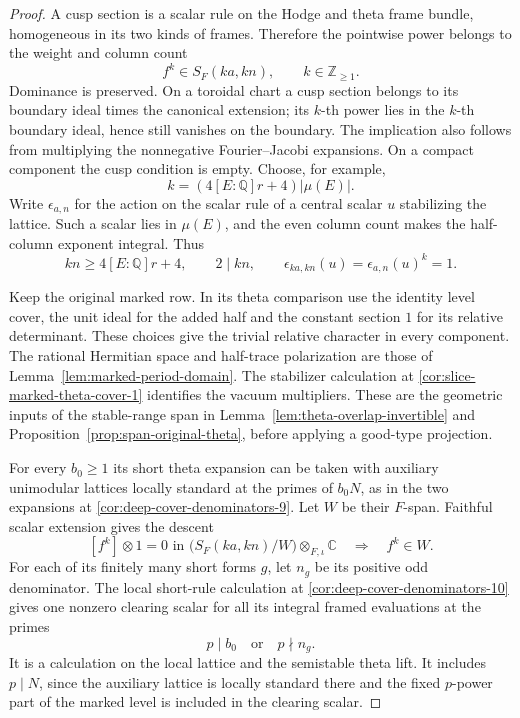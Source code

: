 \begin{proof}
A cusp section is a scalar rule on the Hodge and theta frame
bundle, homogeneous in its two kinds of frames. Therefore the
pointwise power belongs to the weight and column count
\[
       f^k\in S_F(ka,kn),\qquad k\in\mathbb Z_{\ge1}.
\]
Dominance is preserved. On a toroidal chart a cusp section belongs
to its boundary ideal times the canonical extension; its \(k\)-th
power lies in the \(k\)-th boundary ideal, hence still vanishes
on the boundary. The implication also follows from multiplying
the nonnegative Fourier--Jacobi expansions. On a compact
component the cusp condition is empty. Choose, for example,
\[
        k=(4[E:\mathbb Q]r+4)|\mu(E)|.
\]
Write \(\epsilon_{a,n}\) for the action on the scalar rule
of a central scalar \(u\) stabilizing the lattice. Such a
scalar lies in \(\mu(E)\), and the even column count makes the
half-column exponent integral. Thus
\[
 kn\ge 4[E:\mathbb Q]r+4,\qquad 2\mid kn,\qquad
 \epsilon_{ka,kn}(u)=\epsilon_{a,n}(u)^k=1 .
\]

Keep the original marked row. In its theta comparison use the
identity level cover, the unit ideal for the added half and the
constant section \(1\) for its relative determinant. These choices
give the trivial relative character in every component. The
rational Hermitian space and half-trace polarization are those
of Lemma~\ref{lem:marked-period-domain}. The stabilizer calculation
at \ref{cor:slice-marked-theta-cover-1} identifies the vacuum
multipliers. These are the geometric inputs of the stable-range
span in Lemma~\ref{lem:theta-overlap-invertible} and
Proposition~\ref{prop:span-original-theta}, before applying a
good-type projection.

For every \(b_0\ge1\) its short theta expansion can be taken
with auxiliary unimodular lattices locally standard at
the primes of \(b_0N\), as in the two expansions
at \ref{cor:deep-cover-denominators-9}. Let \(W\) be their
\(F\)-span. Faithful scalar extension gives the descent
\[
  [f^k]\otimes1=0\text{ in }
  \bigl(S_F(ka,kn)/W\bigr)\otimes_{F,\iota}\mathbb C
                \quad\Longrightarrow\quad f^k\in W .
\]
For each of its finitely many short forms \(g\), let \(n_g\)
be its positive odd denominator. The local short-rule calculation
at \ref{cor:deep-cover-denominators-10} gives one nonzero clearing
scalar for all its integral framed evaluations at the primes
\[
                  p\mid b_0\quad\text{or}\quad p\nmid n_g .
\]
It is a calculation on the local lattice and the semistable
theta lift. It includes \(p\mid N\), since the auxiliary lattice
is locally standard there and the fixed \(p\)-power part of
the marked level is included in the clearing scalar.


\end{proof}
